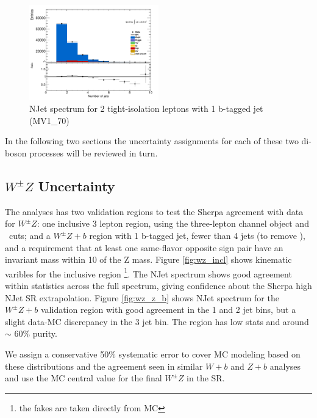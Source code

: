 \begin{figure}[!htbp]
\centering \includegraphics[width=0.5\textwidth]{figs/WZ/ZbVR}
\caption{NJet spectrum for 2 tight-isolation leptons with 1 b-tagged jet (MV1\_70)} 
\label{fig:wz_zb}
\end{figure} 

In the following two sections the uncertainty assignments for each of these two di-boson processes will be reviewed in turn. 

\subsection{$W^{\pm}Z$ Uncertainty} 
The \tth analyses has two validation regions to test the Sherpa agreement with data for $W^{\pm}Z$: one inclusive 3 lepton region, using the three-lepton channel object and \pt\ cuts; and a $W^{\pm}Z+b$ region with 1 b-tagged jet, fewer than 4 jets (to remove \ttV), and a requirement that at least one same-flavor opposite sign pair have an invariant mass within 10 \gevcc of the Z mass. Figure \ref{fig:wz_incl} shows kinematic varibles for the inclusive region \footnote{the fakes are taken directly from MC}. The NJet spectrum shows good agreement within statistics across the full spectrum, giving confidence about the Sherpa high NJet SR extrapolation. Figure \ref{fig:wz_z_b} shows NJet spectrum for the $W^{\pm}Z+b$ validation region with good agreement in the 1 and 2 jet bins, but a slight data-MC discrepancy in the 3 jet bin. The region has low stats and around $\sim$ 60\% purity. 

We assign a conservative 50\% systematic error to cover MC modeling based on these distributions and the agreement seen in similar $W+b$ and $Z+b$ analyses and use the MC central value for the final $W^{\pm}Z$ in the SR. 

